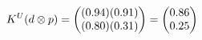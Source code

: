 \documentclass[preview]{standalone}
\begin{document}
\begin{align*}
\special{dvisvgm:raw <g id='unique000'>}K^U(d \otimes p) = \begin{pmatrix} (0.94)(0.91) \\ (0.80)(0.31) \end{pmatrix} = \begin{pmatrix} 0.86 \\ 0.25 \end{pmatrix}\special{dvisvgm:raw </g>}
\end{align*}
\end{document}
